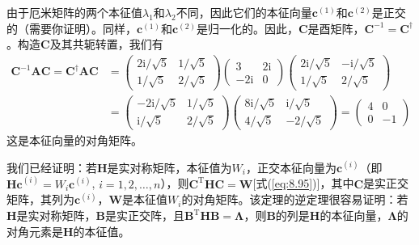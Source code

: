 \begin{examplebox}
        由于厄米矩阵的两个本征值$\lambda_1$和$\lambda_2$不同，因此它们的本征向量$\mathbf{c}^{\left(1\right)}$和$\mathbf{c}^{\left(2\right)}$是正交的（需要你证明）。同样，$\mathbf{c}^{\left(1\right)}$和$\mathbf{c}^{\left(2\right)}$是归一化的。因此，$\mathbf{C}$是酉矩阵，$\mathbf{C}^{-1} = \mathbf{C}^{\dagger}$。构造$\mathbf{C}$及其共轭转置，我们有
        \begin{equation*}
            \begin{aligned}
                \mathbf{C}^{-1} \mathbf{AC} = \mathbf{C}^{\dagger} \mathbf{A} \mathbf{C} &= \begin{pmatrix}
                    2\mathrm{i}/\sqrt{5} & 1/\sqrt{5} \\
                    1/\sqrt{5} & 2/\sqrt{5}
                \end{pmatrix} \begin{pmatrix}
                    3 & 2\mathrm{i} \\
                    -2\mathrm{i} & 0
                \end{pmatrix} \begin{pmatrix}
                    2\mathrm{i}/\sqrt{5} & -\mathrm{i}/\sqrt{5} \\
                    1/\sqrt{5} & 2/\sqrt{5}
                \end{pmatrix} \\
                &= \begin{pmatrix}
                    -2\mathrm{i}/\sqrt{5} & 1/\sqrt{5} \\
                    \mathrm{i}/\sqrt{5} & 2/\sqrt{5}
                \end{pmatrix} \begin{pmatrix}
                    8\mathrm{i}/\sqrt{5} & \mathrm{i}/\sqrt{5} \\
                    4/\sqrt{5} & -2/\sqrt{5}
                \end{pmatrix}  = \begin{pmatrix}
                    4 & 0 \\
                    0 & -1
                \end{pmatrix}
            \end{aligned}
        \end{equation*}
        这是本征向量的对角矩阵。
    \end{examplebox}

    我们已经证明：若$\mathbf{H}$是实对称矩阵，本征值为$W_i$，正交本征向量为$\mathbf{c}^{\left(i\right)}$（即$\mathbf{Hc}^{\left(i\right)} = W_i\mathbf{c}^{\left(i\right)}$, $i = 1,2,\ldots,n$），则$\mathbf{C}^{\mathrm{T}}\mathbf{H}\mathbf{C} = \mathbf{W}$[式(\ref{eq:8.95})]，其中$\mathbf{C}$是实正交矩阵，其列为$\mathbf{c}^{\left(i\right)}$，$\mathbf{W}$是本征值$W_i$的对角矩阵。该定理的逆定理很容易证明：若$\mathbf{H}$是实对称矩阵，$\mathbf{B}$是实正交阵，且$\mathbf{B}^{\mathrm{T}}\mathbf{H}\mathbf{B} = \symbf{\Lambda}$，则$\mathbf{B}$的列是$\mathbf{H}$的本征向量，$\symbf{\Lambda}$的对角元素是$\mathbf{H}$的本征值。

